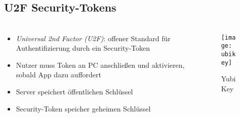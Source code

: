 \subsection{U2F Security-Tokens}
\begin{frame}
    \frametitle{\currentsectionname}
    \begin{columns}
        \begin{column}{0.7\textwidth}
            \begin{itemize}
                \item \textit{Universal 2nd Factor (U2F)}:
                    offener Standard für Authentifizierung durch ein Security-Token
                \item Nutzer muss Token an PC anschließen und aktivieren,
                    sobald App dazu auffordert
                \item Server speichert öffentlichen Schlüssel
                \item Security-Token speicher geheimen Schlüssel
            \end{itemize}
        \end{column}
        \begin{column}{0.3\textwidth}
            \begin{figure}
                \texttt{[image: ubikey]}
                \caption{YubiKey}
            \end{figure}
        \end{column}
    \end{columns}

\end{frame}

